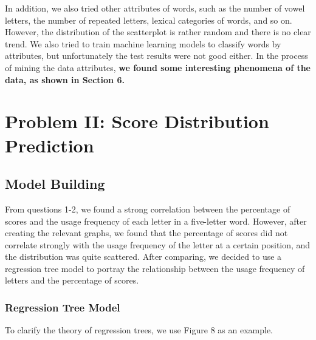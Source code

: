 \documentclass[12pt]{article}
\begin{document}
In addition, we also tried other attributes of words, such as the number of vowel letters, the number of repeated letters, lexical categories of words, and so on. However, the distribution of the scatterplot is rather random and there is no clear trend. 
We also tried to train machine learning models to classify words by attributes, but unfortunately the test results were not good either. In the process of mining the data attributes, \textbf{we found some interesting phenomena of the data, as shown in Section 6.}






\section{Problem II: Score Distribution Prediction}

\subsection{Model Building}

From questions 1-2, we found a strong correlation between the percentage of scores and the usage frequency of each letter in a five-letter word. 
However, after creating the relevant graphs, we found that the percentage of scores did not correlate strongly with the usage frequency of the letter at a certain position, and the distribution was quite scattered. 
After comparing, we decided to use a regression tree model to portray the relationship between the usage frequency of letters and the percentage of scores.
\subsubsection{Regression Tree Model}

To clarify the theory of regression trees, we use Figure 8 as an example.
\end{document}
